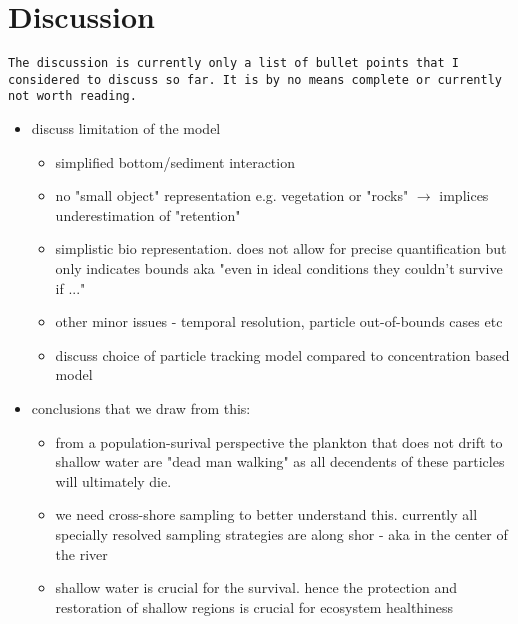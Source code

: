 \section*{Discussion}
\texttt{The discussion is currently only a list of bullet points that I considered to discuss so far. It is by no means complete or currently not worth reading.}
\begin{itemize}
    \item discuss limitation of the model
    \begin{itemize}
        \item simplified bottom/sediment interaction
        \item no "small object" representation e.g. vegetation or "rocks" $\rightarrow$ implices underestimation of "retention"
        \item simplistic bio representation. does not allow for precise quantification but only indicates bounds aka "even in ideal conditions they couldn't survive if ..."
        \item other minor issues - temporal resolution, particle out-of-bounds cases etc
        \item discuss choice of particle tracking model compared to concentration based model
    \end{itemize}
    \item conclusions that we draw from this:
    \begin{itemize}
        \item from a population-surival perspective the plankton that does not drift to shallow water are "dead man walking" as all decendents of these particles will ultimately die.
        \item we need cross-shore sampling to better understand this. currently all specially resolved sampling strategies are along shor - aka in the center of the river
        \item shallow water is crucial for the survival. hence the protection and restoration of shallow regions is crucial for ecosystem healthiness
    \end{itemize}
\end{itemize}